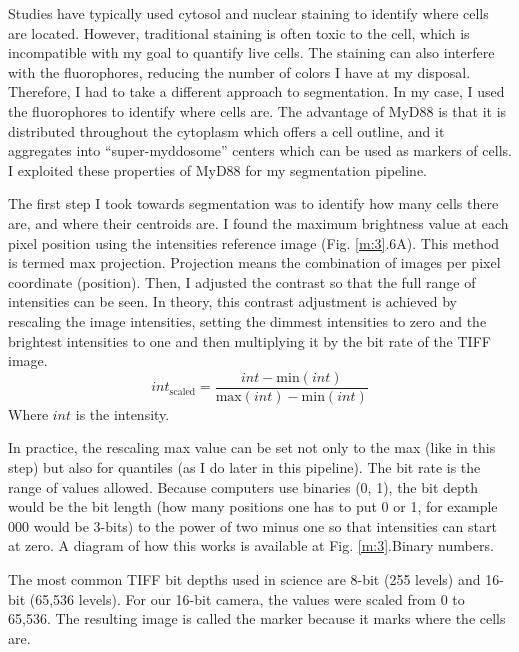 Studies have typically used cytosol and nuclear staining to identify where cells are located. However, traditional staining is often toxic to the cell, which is incompatible with my goal to quantify live cells. The staining can also interfere with the fluorophores, reducing the number of colors I have at my disposal. Therefore, I had to take a different approach to segmentation. In my case, I used the fluorophores to identify where cells are. The advantage of MyD88 is that it is distributed throughout the cytoplasm which offers a cell outline, and it aggregates into “super-myddosome” centers which can be used as markers of cells. I exploited these properties of MyD88 for my segmentation pipeline.

The first step I took towards segmentation was to identify how many cells there are, and where their centroids are. I found the maximum brightness value at each pixel position using the intensities reference image (Fig. \ref{m:3}.6A). This method is termed max projection. Projection means the combination of images per pixel coordinate (position). Then, I adjusted the contrast so that the full range of intensities can be seen. In theory, this contrast adjustment is achieved by rescaling the image intensities, setting the dimmest intensities to zero and the brightest intensities to one and then multiplying it by the bit rate of the TIFF image.
 \begin{equation}
int_\text{scaled} = \frac{int - \text{min}(int)}{\text{max}(int)- \text{min}(int)}
\end{equation}
Where $int$ is the intensity.

In practice, the rescaling max value can be set not only to the max (like in this step) but also for quantiles (as I do later in this pipeline). The bit rate is the range of values allowed. Because computers use binaries (0, 1), the bit depth would be the bit length (how many positions one has to put 0 or 1, for example 000 would be 3-bits) to the power of two minus one so that intensities can start at zero. A diagram of how this works is available at Fig. \ref{m:3}.Binary numbers.

The most common TIFF bit depths used in science are 8-bit (255 levels) and 16-bit (65,536 levels). For our 16-bit camera, the values were scaled from 0 to 65,536. The resulting image is called the marker because it marks where the cells are.

